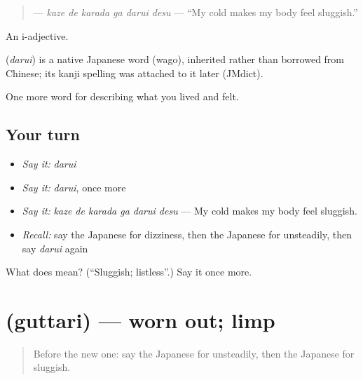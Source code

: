 \begin{quote}
\textbf{  } — \emph{kaze de karada ga darui desu} — \textquotedblleft{}My cold makes my body feel sluggish.\textquotedblright{}
\end{quote}

An i-adjective.

\begin{cousinweb}
\textbf{} (\emph{darui}) is a native Japanese word (wago), inherited rather than borrowed from Chinese; its kanji spelling was attached to it later (JMdict).
\end{cousinweb}

\begin{grammarlens}[title={What you've built}]
One more word for describing what you lived and felt.
\end{grammarlens}

\subsection*{Your turn}
\begin{itemize}
\raggedright
  \item \emph{Say it:} \emph{darui}
  \item \emph{Say it:} \emph{darui}, once more
  \item \emph{Say it:} \emph{kaze de karada ga darui desu} — My cold makes my body feel sluggish.
  \item \emph{Recall:} say the Japanese for dizziness, then the Japanese for unsteadily, then say \emph{darui} again
\end{itemize}

\begin{tcolorbox}[breakable,colback=teal!4,colframe=teal!35!black,title={Before you move on}]
What does  mean? (\textquotedblleft{}Sluggish; listless\textquotedblright{}.) Say it once more.
\end{tcolorbox}
\section[\texorpdfstring{\ja{ぐったり} (guttari)}{ぐったり (guttari)}]{ (guttari) — worn out; limp}

\label{lesson:JA-C447-guttari}



\begin{quote}
Before the new one: say the Japanese for unsteadily, then the Japanese for sluggish.
\end{quote}

